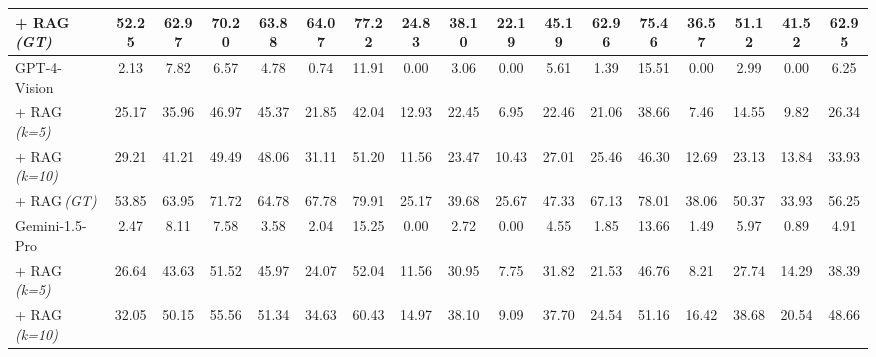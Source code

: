 \begin{table*}[t]
{\begin{tabular}{l|cc|c|c|cc|cc|cc|cc|cc|cc}
\hspace{2em}  + RAG\,\textit{(GT)} & 52.25 & 62.97 & 70.20 & 63.88 & 64.07 & 77.22 & 24.83 & 38.10 & 22.19 & 45.19 & 62.96 & 75.46 & 36.57 & 51.12 & \colorbox{lightblue!75}{41.52} & 62.95 \\

\midrule
GPT-4-Vision & 2.13 & 7.82 & 6.57 & 4.78 & 0.74 & 11.91 & \colorbox{lightblue!75}{0.00} & 3.06 & 0.00 & 5.61 & 1.39 & \colorbox{lightblue!75}{15.51} & 0.00 & 2.99 & 0.00 & 6.25 \\

\hspace{2em}  + RAG\,\textit{(k=5)} & 25.17 & 35.96 & 46.97 & 45.37 & 21.85 & 42.04 & 12.93 & 22.45 & 6.95 & 22.46 & 21.06 & 38.66 & 7.46 & 14.55 & 9.82 & 26.34 \\

\hspace{2em}  + RAG\,\textit{(k=10)} & 29.21 & 41.21 & 49.49 & 48.06 & 31.11 & 51.20 & 11.56 & 23.47 & 10.43 & 27.01 & 25.46 & 46.30 & 12.69 & 23.13 & 13.84 & 33.93 \\

\hspace{2em}  + RAG\,\textit{(GT)} & 53.85 & 63.95 & 71.72 & 64.78 & 67.78 & 79.91 & 25.17 & 39.68 & \colorbox{lightblue!75}{25.67} & 47.33 & 67.13 & 78.01 & 38.06 & 50.37 & 33.93 & 56.25 \\

\midrule
Gemini-1.5-Pro & 2.47 & 8.11 & 7.58 & 3.58 & \colorbox{lightblue!75}{2.04} & \colorbox{lightblue!75}{15.25} & \colorbox{lightblue!75}{0.00} & 2.72 & 0.00 & 4.55 & 1.85 & 13.66 & \colorbox{lightblue!75}{1.49} & 5.97 & \colorbox{lightblue!75}{0.89} & 4.91 \\

\hspace{2em}  + RAG\,\textit{(k=5)} & 26.64 & 43.63 & \colorbox{lightblue!75}{51.52} & 45.97 & 24.07 & 52.04 & 11.56 & 30.95 & 7.75 & 31.82 & \colorbox{lightblue!75}{21.53} & 46.76 & \colorbox{lightblue!75}{8.21} & 27.74 & 14.29 & 38.39 \\

\hspace{2em}  + RAG\,\textit{(k=10)} & \colorbox{lightblue!75}{32.05} & 50.15 & \colorbox{lightblue!75}{55.56} & 51.34 & \colorbox{lightblue!75}{34.63} & \colorbox{lightblue!75}{60.43} & 14.97 & 38.10 & 9.09 & 37.70 & 24.54 & 51.16 & 16.42 & 38.68 & \colorbox{lightblue!75}{20.54} & \colorbox{lightblue!75}{48.66} \\


\end{tabular}}
\end{table*}
